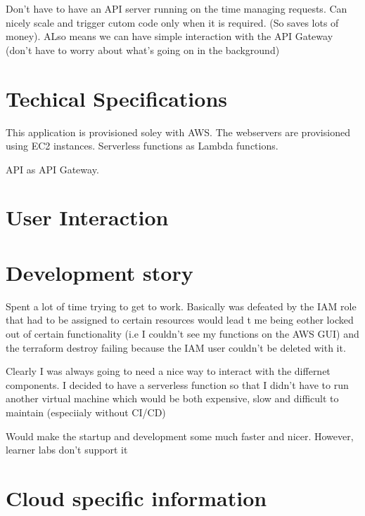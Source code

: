 \documentclass[12pt]{article}
\begin{document}
Don't have to have an API server running on the time managing requests. Can nicely scale and trigger cutom code only when it is required. (So saves lots of money). ALso means we can have simple interaction with the API Gateway (don't have to worry about what's going on in the background)

\section{Techical Specifications}

This application is provisioned soley with AWS. 
The webservers are provisioned using EC2 instances.
Serverless functions as Lambda functions.

API as API Gateway.

\section*{User Interaction}

\section*{Development story}

Spent a lot of time trying to get to work.
Basically was defeated by the IAM role that had to be assigned to certain resources would lead t me being eother locked out of certain functionality (i.e I couldn't see my functions on the AWS GUI) and the terraform destroy failing because the IAM user couldn't be deleted with it.



Clearly I was always going to need a nice way to interact with the differnet components. I decided to have a serverless function so that I didn't have to run another virtual machine which would be both expensive, slow and difficult to maintain (especiialy without CI/CD)

Would make the startup and development some much faster and nicer. However, learner labs don't support it




\section*{Cloud specific information}


\end{document}
